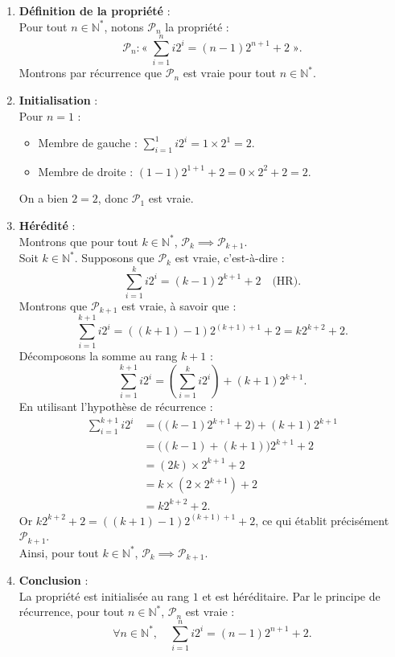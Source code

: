 \documentclass[11pt,a4paper]{article}
\newcommand{\N}{\mathbb{N}}
\begin{document}
\begin{correctionbox}
\begin{enumerate}[label=\textbf{\arabic*.}]
    \item \textbf{Définition de la propriété} :\\
    Pour tout $n \in \N^*$, notons $\mathcal{P}_n$ la propriété :
    \[
    \mathcal{P}_n : « \; \sum_{i=1}^n i 2^i = (n-1)2^{n+1} + 2 \; ».
    \]
    Montrons par récurrence que $\mathcal{P}_n$ est vraie pour tout $n \in \N^*$.

    \item \textbf{Initialisation} :\\
    Pour $n = 1$ :
    \begin{itemize}
        \item Membre de gauche : $\sum_{i=1}^1 i 2^i = 1 \times 2^1 = 2$.
        \item Membre de droite : $(1 - 1)2^{1+1} + 2 = 0 \times 2^2 + 2 = 2$.
    \end{itemize}
    On a bien $2 = 2$, donc $\mathcal{P}_1$ est vraie.

    \item \textbf{Hérédité} :\\
    Montrons que pour tout $k \in \N^*$, $\mathcal{P}_k \implies \mathcal{P}_{k+1}$.\\
    Soit $k \in \N^*$. Supposons que $\mathcal{P}_k$ est vraie, c'est-à-dire :
    \[
    \sum_{i=1}^k i 2^i = (k-1)2^{k+1} + 2 \quad \text{(HR)}.
    \]
    Montrons que $\mathcal{P}_{k+1}$ est vraie, à savoir que :
    \[
    \sum_{i=1}^{k+1} i 2^i = ((k+1)-1)2^{(k+1)+1} + 2 = k 2^{k+2} + 2.
    \]
    Décomposons la somme au rang $k+1$ :
    \[
    \sum_{i=1}^{k+1} i 2^i = \left(\sum_{i=1}^k i 2^i\right) + (k+1)2^{k+1}.
    \]
    En utilisant l'hypothèse de récurrence :
    \begin{align*}
    \sum_{i=1}^{k+1} i 2^i &= \Big( (k-1)2^{k+1} + 2 \Big) + (k+1)2^{k+1} \\
                          &= \Big( (k-1) + (k+1) \Big) 2^{k+1} + 2 \\
                          &= (2k) \times 2^{k+1} + 2 \\
                          &= k \times \left(2 \times 2^{k+1}\right) + 2 \\
                          &= k 2^{k+2} + 2.
    \end{align*}
    Or $k 2^{k+2} + 2 = ((k+1)-1)2^{(k+1)+1} + 2$, ce qui établit précisément $\mathcal{P}_{k+1}$.\\
    Ainsi, pour tout $k \in \N^*$, $\mathcal{P}_k \implies \mathcal{P}_{k+1}$.

    \item \textbf{Conclusion} :\\
    La propriété est initialisée au rang $1$ et est héréditaire. Par le principe de récurrence, pour tout $n \in \N^*$, $\mathcal{P}_n$ est vraie :
    \[
    \forall n \in \N^*, \quad \sum_{i=1}^n i 2^i = (n-1)2^{n+1} + 2.
    \]
\end{enumerate}
\end{correctionbox}
\end{document}
